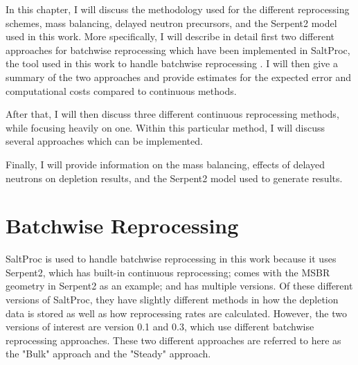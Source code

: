 
\renewcommand*\descriptionlabel[1]{\hspace\leftmargin$#1$}
\setcounter{tocdepth}{5}
\setcounter{secnumdepth}{5}






In this chapter, I will discuss the methodology used for the different reprocessing schemes, mass balancing, delayed neutron precursors, and the Serpent2 model used in this work.
More specifically, I will describe in detail first two different approaches for batchwise reprocessing which have been implemented in SaltProc, the tool used in this work to handle batchwise reprocessing \cite{rykhlevskii_saltproc_2018}. I will then give a summary of the two approaches and provide estimates for the expected error and computational costs compared to continuous methods.

After that, I will then discuss three different continuous reprocessing methods, while focusing heavily on one.
Within this particular method, I will discuss several approaches which can be implemented.

Finally, I will provide information on the mass balancing, effects of delayed neutrons on depletion results, and the Serpent2 model used to generate results.

\section{Batchwise Reprocessing}

SaltProc is used to handle batchwise reprocessing in this work because it uses Serpent2, which has built-in continuous reprocessing; comes with the MSBR geometry in Serpent2 as an example; and has multiple versions.
Of these different versions of SaltProc, they have slightly different methods in how the depletion data is stored as well as how reprocessing rates are calculated.
However, the two versions of interest are version 0.1 and 0.3, which use different batchwise reprocessing approaches.
These two different approaches are referred to here as the "Bulk" approach and the "Steady" approach.

